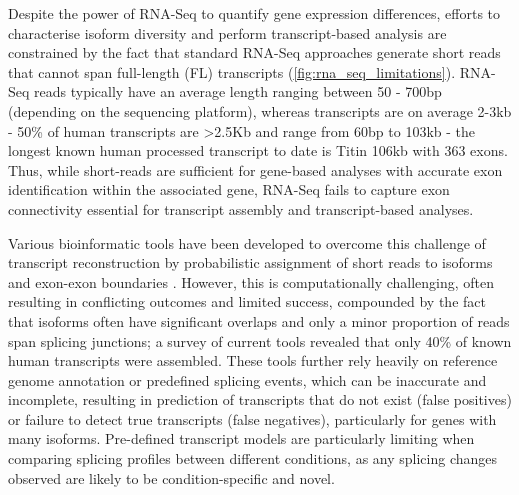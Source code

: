 Despite the power of RNA-Seq to quantify gene expression differences, efforts to characterise isoform diversity and perform transcript-based analysis are constrained by the fact that standard RNA-Seq approaches generate short reads that cannot span full-length (FL) transcripts (\cref{fig:rna_seq_limitations}). RNA-Seq reads typically have an average length ranging between 50 - 700bp (depending on the sequencing platform), whereas transcripts are on average 2-3kb - 50\% of human transcripts are >2.5Kb\cite{Sharon2013} and range from 60bp to 103kb \cite{Piovesan2016,Sharon2013} - the longest known human processed transcript to date is Titin 106kb with 363 exons\cite{Bang2001}. Thus, while short-reads are sufficient for gene-based analyses with accurate exon identification within the associated gene, RNA-Seq fails to capture exon connectivity essential for transcript assembly and transcript-based analyses\cite{Gordon2015}\cite{Wang2016}. 

Various bioinformatic tools have been developed to overcome this challenge of transcript reconstruction by probabilistic assignment of short reads to isoforms and exon-exon boundaries \cite{Trapnell2010, Kingsford2010, Au2013}. However, this is computationally challenging, often resulting in conflicting outcomes and limited success\cite{Steijger2013}, compounded by the fact that isoforms often have significant overlaps and only a minor proportion of reads span splicing junctions; a survey of current tools revealed that only 40\% of known human transcripts were assembled\cite{Steijger2013}. These tools further rely heavily on reference genome annotation or predefined splicing events, which can be inaccurate and incomplete, resulting in prediction of transcripts that do not exist (false positives) or failure to detect true transcripts (false negatives), particularly for genes with many isoforms\cite{Au2013}. Pre-defined transcript models are particularly limiting when comparing splicing profiles between different conditions, as any splicing changes observed are likely to be condition-specific and novel. 

